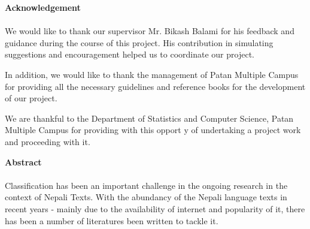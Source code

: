 \documentclass[12pt]{report}
\begin{document}




    \newpage

    \begin{center}
        \textbf{\Large Acknowledgement}


    \end{center}
    \paragraph{}
        We would like to thank our supervisor Mr. Bikash Balami for his feedback and guidance during the course of this project.
        His contribution in simulating suggestions and encouragement helped us to coordinate our project.

        In addition, we would like to thank the management of Patan Multiple Campus for providing all the necessary guidelines and reference books for the development of
        our project.

        We are thankful to the Department of Statistics and Computer Science, Patan Multiple Campus for providing with this opport y of undertaking a project work and
        proceeding with it.







    \newpage

 \begin{center}
        \textbf{\Large Abstract}


    \end{center}
    \paragraph{}
        Classification has been an important challenge in the ongoing research in the context of Nepali Texts.
        With the abundancy of the Nepali language texts in recent years - mainly due to the availability of internet and
        popularity of it, there has been a number of literatures been written to tackle it.
\end{document}
